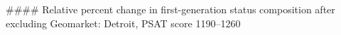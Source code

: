 #### Relative percent change in first-generation status composition after excluding Geomarket: Detroit, PSAT score 1190–1260
